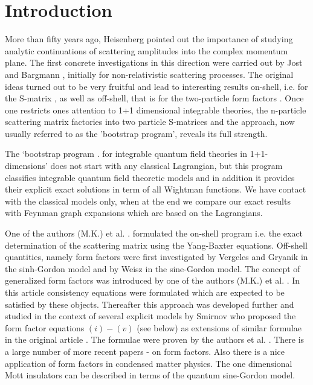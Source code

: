 \documentclass[a4paper,12pt]{article}
\begin{document}
\section{Introduction}

More than fifty years ago, Heisenberg \cite{Heisen} pointed out the
importance of studying analytic continuations of scattering amplitudes into
the complex momentum plane. The first concrete investigations in this
direction were carried out by Jost \cite{Jost} and Bargmann \cite{Bargmann},
initially for non-relativistic scattering processes. The original ideas
turned out to be very fruitful and lead to interesting results on-shell,
i.e. for the S-matrix \cite{ELOP}, as well as off-shell, that is for the
two-particle form factors \cite{Barton}. Once one restricts ones attention to
1+1 dimensional integrable theories, the n-particle scattering matrix
factories into two particle S-matrices and the approach, now usually
referred to as the 'bootstrap program', reveals its full strength.

The `bootstrap program \cite{K2}. for integrable quantum field theories in
1+1-dimensions' does not start with any classical Lagrangian, but this
program classifies integrable quantum field theoretic models and in addition
it provides their explicit exact solutions in term of all Wightman
functions. We have contact with the classical models only, when at the end
we compare our exact results with Feynman graph expansions which are based
on the Lagrangians.

One of the authors (M.K.) et al. \cite{KTTW}. formulated the on-shell program
i.e. the exact determination of the scattering matrix using the Yang-Baxter
equations. Off-shell quantities, namely form factors were first investigated
by Vergeles and Gryanik \cite{VG} in the sinh-Gordon model and by Weisz \cite
{W} in the sine-Gordon model. The concept of generalized form factors was
introduced by one of the authors (M.K.) et al. \cite{KW}. In this article
consistency equations were formulated which are expected to be satisfied by
these objects. Thereafter this approach was developed further and studied in
the context of several explicit models by Smirnov \cite{Sm} who proposed the
form factor equations $(i)-(v)$ (see below) as extensions of similar
formulae in the original article \cite{KW}. The formulae were proven by the
authors et al. \cite{BFKZ}. There is a large number of more recent papers 
\cite{CM}-\cite{BK2} on form factors. Also there is a nice application \cite
{GNT,CET} of form factors in condensed matter physics. The one dimensional
Mott insulators can be described in terms of the quantum sine-Gordon model.
\end{document}
